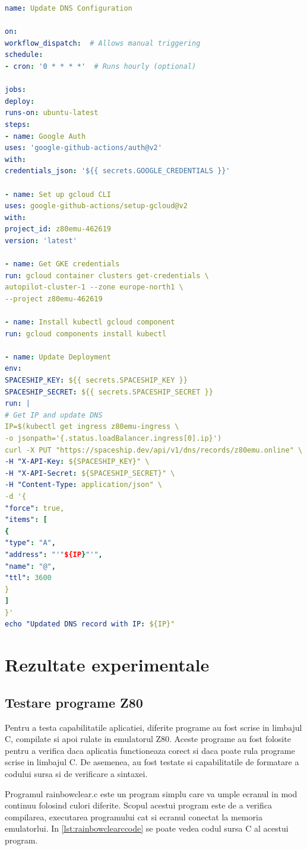 \documentclass[titlepage,12pt]{article}
\DeclareRobustCommand{\code}[1]{{\ttfamily\small #1}}
\begin{document}
\begin{lstlisting}[language=yaml,caption={Workflow de actualizare a inregistrarilor DNS},label={lst:updatednsworkflow}]
name: Update DNS Configuration

on:
workflow_dispatch:  # Allows manual triggering
schedule:
- cron: '0 * * * *'  # Runs hourly (optional)

jobs:
deploy:
runs-on: ubuntu-latest
steps:
- name: Google Auth
uses: 'google-github-actions/auth@v2'
with:
credentials_json: '${{ secrets.GOOGLE_CREDENTIALS }}'

- name: Set up gcloud CLI
uses: google-github-actions/setup-gcloud@v2
with:
project_id: z80emu-462619
version: 'latest'

- name: Get GKE credentials
run: gcloud container clusters get-credentials \
autopilot-cluster-1 --zone europe-north1 \
--project z80emu-462619

- name: Install kubectl gcloud component
run: gcloud components install kubectl

- name: Update Deployment
env:
SPACESHIP_KEY: ${{ secrets.SPACESHIP_KEY }}
SPACESHIP_SECRET: ${{ secrets.SPACESHIP_SECRET }}
run: |
# Get IP and update DNS
IP=$(kubectl get ingress z80emu-ingress \
-o jsonpath='{.status.loadBalancer.ingress[0].ip}')
curl -X PUT "https://spaceship.dev/api/v1/dns/records/z80emu.online" \
-H "X-API-Key: ${SPACESHIP_KEY}" \
-H "X-API-Secret: ${SPACESHIP_SECRET}" \
-H "Content-Type: application/json" \
-d '{
"force": true,
"items": [
{
"type": "A",
"address": "'"${IP}"'",
"name": "@",
"ttl": 3600
}
]
}'
echo "Updated DNS record with IP: ${IP}"
\end{lstlisting}

\clearpage
\section{Rezultate experimentale}
\subsection{Testare programe Z80}
Pentru a testa capabilitatile aplicatiei, diferite programe au fost scrise in limbajul C, compilate si apoi rulate in emulatorul Z80. Aceste programe au fost folosite pentru a verifica daca aplicatia functioneaza corect si daca poate rula programe scrise in limbajul C. De asemenea, au fost testate si capabilitatile de formatare a codului sursa si de verificare a sintaxei.

Programul \code{rainbowclear.c} este un program simplu care va umple ecranul in mod continuu folosind culori diferite. Scopul acestui program este de a verifica compilarea, executarea programului cat si ecranul conectat la memoria emulatorlui. In \cref{lst:rainbowclearccode} se poate vedea codul sursa C al acestui program.
\end{document}

